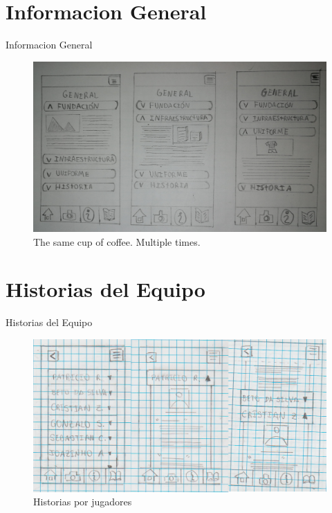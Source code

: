 \documentclass[11pt]{beamer}
\begin{document}
\section{Informacion General}
\begin{frame}{Informacion General}
\begin{figure}
 \centering
   \includegraphics[width=\linewidth]{copia_all.jpg}
   \caption{Informacion General.}

    \caption{The same cup of coffee. Multiple times.}
   \end{figure}
\end{frame}
\section{Historias del Equipo}
\begin{frame}{Historias del Equipo}
\begin{figure}
\centering
   \includegraphics[width=\linewidth]{trabajo.png}
   \caption{Historias por jugadores}
\end{figure}
\end{frame}
\end{document}
